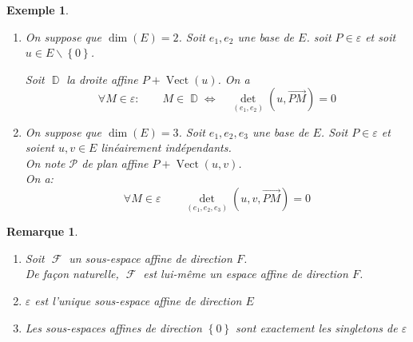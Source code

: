 \documentclass[a4paper, oneside]{report}
\theoremstyle{break}
\newtheorem{exemple}[thm]{Exemple}
\newtheorem{remarque}[thm]{Remarque}
\DeclareMathOperator{\D}{\mathbb{D}}
\DeclareMathOperator{\F}{\mathcal{F}}
\renewcommand{\P}{\mathcal{P}}
\DeclarePairedDelimiter\ens{\left\{ }{\right\} }%
\DeclareMathOperator{\Vect}{Vect}
\renewcommand{\ens}[1]{\left\{ #1 \right\} }%
\newcommand{\ensF}{\F}
\newcommand{\ensP}{\P}
\newcommand{\ensD}{\D}
\begin{document}
\begin{exemple}
\begin{enumerate}
\item  On suppose que $\dim(E) = 2$. Soit $e_1, e_2$ une base de $E$. soit $P \in \varepsilon$ et soit $u \in E \backslash \ens{0}$.

Soit $\ensD$ la droite affine $P + \Vect(u)$. On a
\[
\forall M \in \varepsilon :	\qquad		M \in \ensD \Leftrightarrow	\quad	\det_{(e_1, e_2)}(u, \vec{PM}) = 0
\]

\medbreak

\item  On suppose que $\dim(E) = 3$. Soit $e_1, e_2, e_3$ une base de $E$. Soit $P \in \varepsilon$ et soient $u, v \in E$ linéairement indépendants.\\
On note $\ensP$ de plan affine $P + \Vect(u, v)$.\\
On a:
\[
\forall M \in \varepsilon	\qquad		\det_{(e_1, e_2, e_3)}(u, v, \vec{PM}) = 0
\]
\end{enumerate}
\end{exemple}

\begin{remarque}
\begin{enumerate}
\item Soit $\ensF$ un sous-espace affine de direction $F$.\\
De façon naturelle, $\ensF$ est lui-même un espace affine de direction $F$.

\medbreak

\item $\varepsilon$ est l'unique sous-espace affine de direction $E$

\medbreak

\item  Les sous-espaces affines de direction $\ens{0}$ sont exactement les singletons de $\varepsilon$
\end{enumerate}
\end{remarque}
\end{document}
